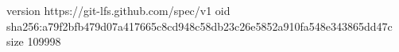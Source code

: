 version https://git-lfs.github.com/spec/v1
oid sha256:a79f2bfb479d07a417665c8cd948c58db23c26e5852a910fa548e343865dd47c
size 109998
